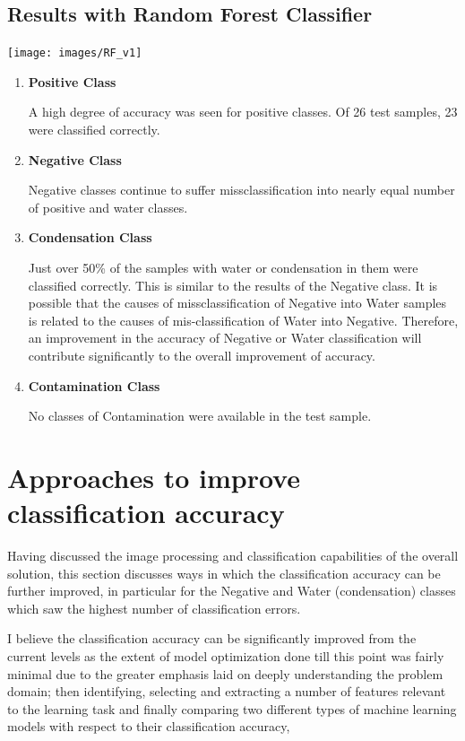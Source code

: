 \documentclass[a4paper,twoside,12pt]{report}
\begin{document}
\section{Results with Random Forest Classifier}

\texttt{[image: images/RF\_v1]}

\begin{enumerate}
\item \textbf{Positive Class}

A high degree of accuracy was seen for positive classes.  Of 26 test samples, 23 were classified correctly. 

\item \textbf{Negative Class}


Negative classes continue to suffer missclassification into nearly equal number of positive and water classes. 

\item \textbf{Condensation Class}

Just over 50\% of the samples with water or condensation in them were classified correctly. This is similar to the results of the Negative class.  It is possible that the causes of missclassification of Negative into Water samples is related to the causes of mis-classification of Water into Negative.    Therefore, an improvement in the accuracy of Negative or Water classification will contribute significantly to the overall improvement of accuracy. 

\item \textbf{Contamination Class}

No classes of Contamination were available in the test sample. 

\end{enumerate}


\chapter{Approaches to improve classification accuracy}

Having discussed the image processing and classification capabilities of the overall solution, this section discusses ways in which the classification accuracy can be further improved, in particular for the Negative and Water (condensation) classes which saw the highest number of classification errors.   

I believe the classification accuracy can be significantly improved from the current levels as the extent of model optimization done till this point was fairly minimal due to the greater emphasis laid on deeply understanding the problem domain; then identifying, selecting and extracting a number of features relevant to the learning task and finally comparing two different types of machine learning models with respect to their classification accuracy, 
\end{document}
